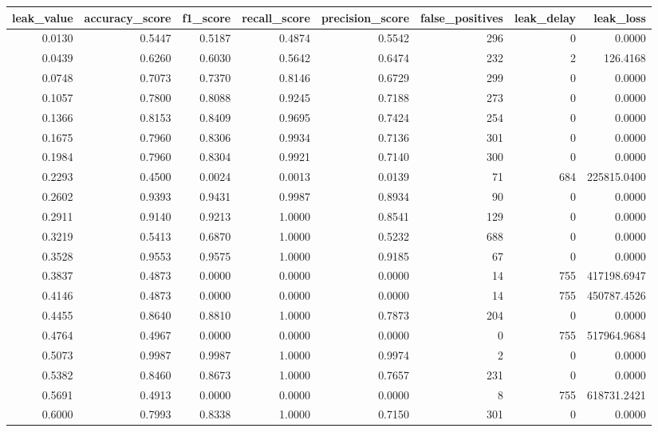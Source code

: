 \begin{tabular}{rrrrrrrr}
\toprule
leak\_value & accuracy\_score & f1\_score & recall\_score & precision\_score & false\_positives & leak\_delay & leak\_loss \\
\midrule
0.0130 & 0.5447 & 0.5187 & 0.4874 & 0.5542 & 296 & 0 & 0.0000 \\
0.0439 & 0.6260 & 0.6030 & 0.5642 & 0.6474 & 232 & 2 & 126.4168 \\
0.0748 & 0.7073 & 0.7370 & 0.8146 & 0.6729 & 299 & 0 & 0.0000 \\
0.1057 & 0.7800 & 0.8088 & 0.9245 & 0.7188 & 273 & 0 & 0.0000 \\
0.1366 & 0.8153 & 0.8409 & 0.9695 & 0.7424 & 254 & 0 & 0.0000 \\
0.1675 & 0.7960 & 0.8306 & 0.9934 & 0.7136 & 301 & 0 & 0.0000 \\
0.1984 & 0.7960 & 0.8304 & 0.9921 & 0.7140 & 300 & 0 & 0.0000 \\
0.2293 & 0.4500 & 0.0024 & 0.0013 & 0.0139 & 71 & 684 & 225815.0400 \\
0.2602 & 0.9393 & 0.9431 & 0.9987 & 0.8934 & 90 & 0 & 0.0000 \\
0.2911 & 0.9140 & 0.9213 & 1.0000 & 0.8541 & 129 & 0 & 0.0000 \\
0.3219 & 0.5413 & 0.6870 & 1.0000 & 0.5232 & 688 & 0 & 0.0000 \\
0.3528 & 0.9553 & 0.9575 & 1.0000 & 0.9185 & 67 & 0 & 0.0000 \\
0.3837 & 0.4873 & 0.0000 & 0.0000 & 0.0000 & 14 & 755 & 417198.6947 \\
0.4146 & 0.4873 & 0.0000 & 0.0000 & 0.0000 & 14 & 755 & 450787.4526 \\
0.4455 & 0.8640 & 0.8810 & 1.0000 & 0.7873 & 204 & 0 & 0.0000 \\
0.4764 & 0.4967 & 0.0000 & 0.0000 & 0.0000 & 0 & 755 & 517964.9684 \\
0.5073 & 0.9987 & 0.9987 & 1.0000 & 0.9974 & 2 & 0 & 0.0000 \\
0.5382 & 0.8460 & 0.8673 & 1.0000 & 0.7657 & 231 & 0 & 0.0000 \\
0.5691 & 0.4913 & 0.0000 & 0.0000 & 0.0000 & 8 & 755 & 618731.2421 \\
0.6000 & 0.7993 & 0.8338 & 1.0000 & 0.7150 & 301 & 0 & 0.0000 \\
\bottomrule
\end{tabular}
